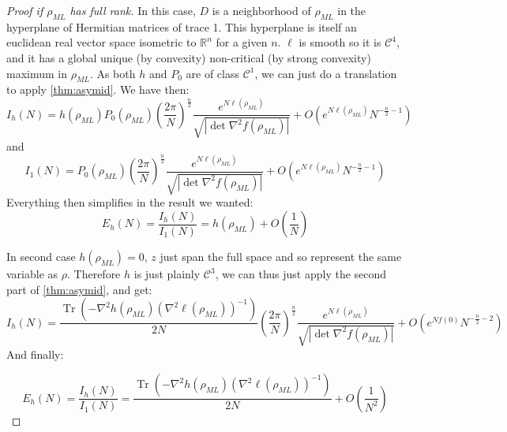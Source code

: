 \documentclass[10pt,a4paper]{report}
\theoremstyle{plain}
\theoremstyle{definition}
\theoremstyle{remark}
\newcommand{\R}{\ensuremath{\mathbb{R}}}
\DeclareMathOperator{\Tr}{Tr}
\newcommand{\class}[1]{{\mathscr{C}^{#1}}}
\newcommand{\ml}{_{M\!L}}
\begin{document}
\begin{proof}[Proof if $\rho\ml$ has full rank]
  In this case, $D$ is a neighborhood of $\rho\ml$ in the hyperplane of
  Hermitian matrices of trace 1.
  This hyperplane is itself an euclidean real vector space isometric to $\R^n$
  for a given $n$. $\ell$ is
  smooth so it is $\class 4$, and it has a global unique (by convexity)
  non-critical (by strong convexity) maximum in $\rho\ml$. As both $h$ and $P_0$
  are of class $\class1$, we can just do a translation to apply
  \cref{thm:asymid}. We have then:
  \[I_h(N) = h(\rho\ml)P_0(\rho\ml)
    {\left(\frac {2\pi}{N}\right)}^{\frac n 2}
    \frac {e^{N\ell(\rho\ml)}}{\sqrt{\left|\det \nabla^2 f(\rho\ml)\right|}}
    + O(e^{N\ell(\rho\ml)} N^{-\frac n 2 -1})\]
  and
  \[I_1(N) = P_0(\rho\ml)
    {\left(\frac {2\pi}{N}\right)}^{\frac n 2}
    \frac {e^{N\ell(\rho\ml)}}{\sqrt{\left|\det \nabla^2 f(\rho\ml)\right|}}
    + O(e^{N\ell(\rho\ml)} N^{-\frac n 2 -1})\]
  Everything then simplifies in the result we wanted:
  \[E_h(N) = \frac{I_h(N)}{I_1(N)} = h(\rho\ml) + O\left(\frac 1N\right)\]

  In second case $h(\rho\ml) = 0$, $z$ just span the full space and so represent
  the same variable as $\rho$. Therefore $h$ is just plainly $\class 3$, we can
  thus just apply the second part of \cref{thm:asymid}, and get:
  \[I_h(N) =
    \frac{\Tr\left(-\nabla^2 h(\rho\ml) {\left(\nabla^2 \ell(\rho\ml)\right)}^{-1}\right)}{2N}
    {\left(\frac {2\pi}{N}\right)}^{\frac n 2}
    \frac {e^{N\ell(\rho\ml)}}{\sqrt{\left|\det \nabla^2 f(\rho\ml)\right|}}
    + O\left(e^{Nf(0)}{N^{-\frac n 2 -2}}\right)\]
  And finally:

  \[E_h(N) = \frac{I_h(N)}{I_1(N)} =
    \frac{\Tr\left(-\nabla^2 h(\rho\ml) {\left(\nabla^2
            \ell(\rho\ml)\right)}^{-1}\right)}{2N}
    + O\left(\frac 1{N^2}\right)\]







\end{proof}
\end{document}

